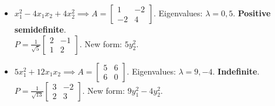 \documentclass[11pt, letterpaper]{article}
\theoremstyle{definition}
\theoremstyle{remark}
\begin{document}
\begin{itemize}
    \item[\textbf{13.}] $x_1^2 - 4x_1 x_2 + 4x_2^2 \implies A = \begin{bmatrix} 1 & -2 \\ -2 & 4 \end{bmatrix}$. Eigenvalues: $\lambda = 0, 5$. \textbf{Positive semidefinite}. \\
    $P = \frac{1}{\sqrt{5}} \begin{bmatrix} 2 & -1 \\ 1 & 2 \end{bmatrix}$. New form: $5y_2^2$.
    
    \item[\textbf{14.}] $5x_1^2 + 12x_1 x_2 \implies A = \begin{bmatrix} 5 & 6 \\ 6 & 0 \end{bmatrix}$. Eigenvalues: $\lambda = 9, -4$. \textbf{Indefinite}. \\
    $P = \frac{1}{\sqrt{13}} \begin{bmatrix} 3 & -2 \\ 2 & 3 \end{bmatrix}$. New form: $9y_1^2 - 4y_2^2$.
\end{itemize}
\end{document}
